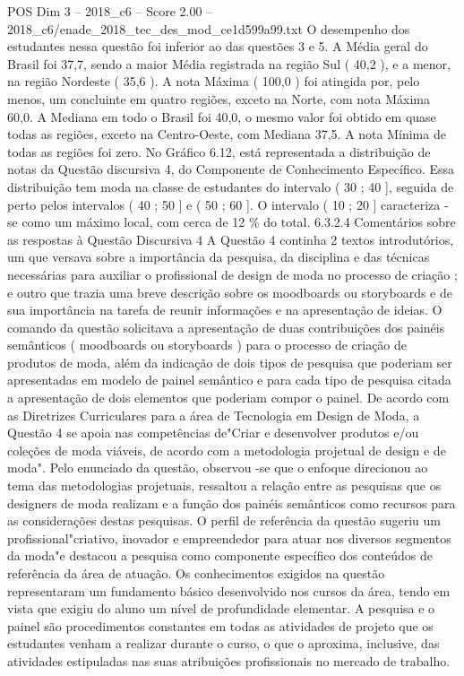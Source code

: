 \begin{textsample}{POS Dim 3 – 2018\_c6 – Score 2.00 – 2018\_c6/enade\_2018\_tec\_des\_mod\_ce1d599a99.txt}
O desempenho dos estudantes nessa questão foi inferior ao das questões 3 e 5.
A Média geral do Brasil foi 37,7, sendo a maior Média registrada na região Sul ( 40,2 ), e a menor, na região Nordeste ( 35,6 ).
A nota Máxima ( 100,0 ) foi atingida por, pelo menos, um concluinte em quatro regiões, exceto na Norte, com nota Máxima 60,0.
A Mediana em todo o Brasil foi 40,0, o mesmo valor foi obtido em quase todas as regiões, exceto na Centro-Oeste, com Mediana 37,5.
A nota Mínima de todas as regiões foi zero.
No Gráfico 6.12, está representada a distribuição de notas da Questão discursiva 4, do Componente de Conhecimento Específico.
Essa distribuição tem moda na classe de estudantes do intervalo ( 30 ; 40 ], seguida de perto pelos intervalos ( 40 ; 50 ] e ( 50 ; 60 ].
O intervalo ( 10 ; 20 ] caracteriza -se como um máximo local, com cerca de 12 \% do total. 6.3.2.4 Comentários sobre as respostas à Questão Discursiva 4 A Questão 4 continha 2 textos introdutórios, um que versava sobre a importância da pesquisa, da disciplina e das técnicas necessárias para auxiliar o profissional de design de moda no processo de criação ; e outro que trazia uma breve descrição sobre os moodboards ou storyboards e de sua importância na tarefa de reunir informações e na apresentação de ideias.
O comando da questão solicitava a apresentação de duas contribuições dos painéis semânticos ( moodboards ou storyboards ) para o processo de criação de produtos de moda, além da indicação de dois tipos de pesquisa que poderiam ser apresentadas em modelo de painel semântico e para cada tipo de pesquisa citada a apresentação de dois elementos que poderiam compor o painel.
De acordo com as Diretrizes Curriculares para a área de Tecnologia em Design de Moda, a Questão 4 se apoia nas competências de"Criar e desenvolver produtos e/ou coleções de moda viáveis, de acordo com a metodologia projetual de design e de moda".
Pelo enunciado da questão, observou -se que o enfoque direcionou ao tema das metodologias projetuais, ressaltou a relação entre as pesquisas que os designers de moda realizam e a função dos painéis semânticos como recursos para as considerações destas pesquisas.
O perfil de referência da questão sugeriu um profissional"criativo, inovador e empreendedor para atuar nos diversos segmentos da moda"e destacou a pesquisa como componente específico dos conteúdos de referência da área de atuação.
Os conhecimentos exigidos na questão representaram um fundamento básico desenvolvido nos cursos da área, tendo em vista que exigiu do aluno um nível de profundidade elementar.
A pesquisa e o painel são procedimentos constantes em todas as atividades de projeto que os estudantes venham a realizar durante o curso, o que o aproxima, inclusive, das atividades estipuladas nas suas atribuições profissionais no mercado de trabalho.

\end{textsample}
